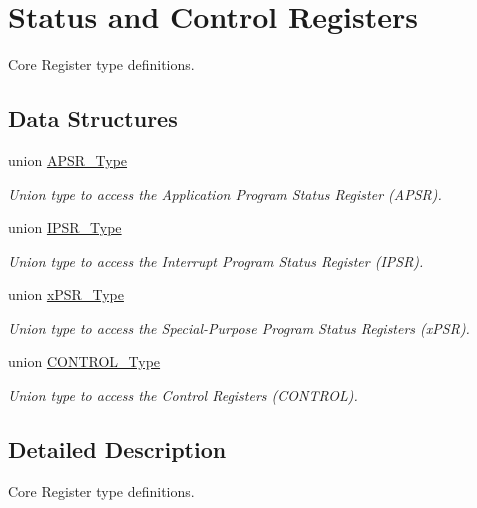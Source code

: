 \hypertarget{group___c_m_s_i_s___c_o_r_e}{\section{Status and Control Registers}
\label{group___c_m_s_i_s___c_o_r_e}
}


Core Register type definitions.  


\subsection*{Data Structures}
\begin{DoxyCompactItemize}
\item 
union \hyperlink{union_a_p_s_r___type}{A\-P\-S\-R\-\_\-\-Type}
\begin{DoxyCompactList}\small\item\em Union type to access the Application Program Status Register (A\-P\-S\-R). \end{DoxyCompactList}\item 
union \hyperlink{union_i_p_s_r___type}{I\-P\-S\-R\-\_\-\-Type}
\begin{DoxyCompactList}\small\item\em Union type to access the Interrupt Program Status Register (I\-P\-S\-R). \end{DoxyCompactList}\item 
union \hyperlink{unionx_p_s_r___type}{x\-P\-S\-R\-\_\-\-Type}
\begin{DoxyCompactList}\small\item\em Union type to access the Special-\/\-Purpose Program Status Registers (x\-P\-S\-R). \end{DoxyCompactList}\item 
union \hyperlink{union_c_o_n_t_r_o_l___type}{C\-O\-N\-T\-R\-O\-L\-\_\-\-Type}
\begin{DoxyCompactList}\small\item\em Union type to access the Control Registers (C\-O\-N\-T\-R\-O\-L). \end{DoxyCompactList}\end{DoxyCompactItemize}


\subsection{Detailed Description}
Core Register type definitions. 